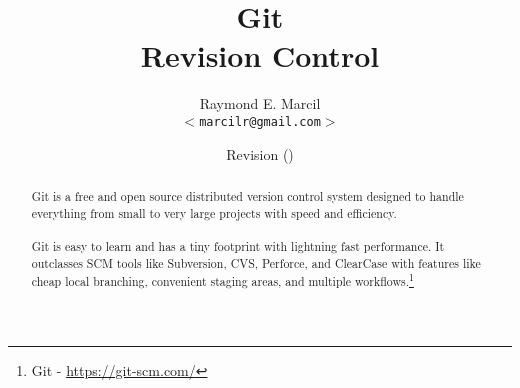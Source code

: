 \documentclass[12pt,letterpaper,dvips]{article}
\title{Git\\
       Revision Control}
\author{Raymond E. Marcil\\
        \texttt{$<$marcilr@gmail.com$>$}
}
\date{Revision \svnInfoRevision
      \hspace{2pt}
      (\svnInfoLongDate)}
\begin{document}
\maketitle

\begin{abstract}
  \noindent Git is a free and open source distributed version control
  system designed to handle everything from small to very large projects
  with speed and efficiency.\\
  \\
  Git is easy to learn and has a tiny footprint with lightning fast
  performance. It outclasses SCM tools like Subversion, CVS, Perforce,
  and ClearCase with features like cheap local branching, convenient
  staging areas, and multiple workflows.\footnote{Git - \href{https://git-scm.com/}{https://git-scm.com/}}
\end{abstract}

\vspace{2.0in}


\newpage
\tableofcontents

\newpage
\listoffigures
\listoftables


\newpage
\setcounter{secnumdepth}{0}
\end{document}
